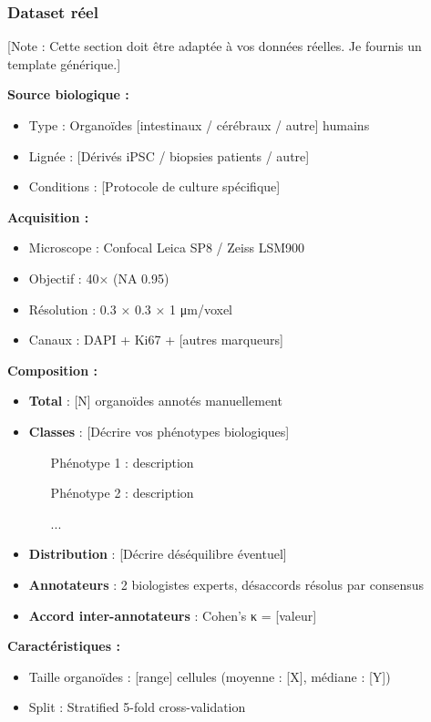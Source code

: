 \subsubsection{Dataset réel}

[Note : Cette section doit être adaptée à vos données réelles. Je fournis un template générique.]

\textbf{Source biologique :}
\begin{itemize}
    \item Type : Organoïdes [intestinaux / cérébraux / autre] humains
    \item Lignée : [Dérivés iPSC / biopsies patients / autre]
    \item Conditions : [Protocole de culture spécifique]
\end{itemize}

\textbf{Acquisition :}
\begin{itemize}
    \item Microscope : Confocal Leica SP8 / Zeiss LSM900
    \item Objectif : 40× (NA 0.95)
    \item Résolution : 0.3 × 0.3 × 1 μm/voxel
    \item Canaux : DAPI + Ki67 + [autres marqueurs]
\end{itemize}

\textbf{Composition :}
\begin{itemize}
    \item \textbf{Total} : [N] organoïdes annotés manuellement
    \item \textbf{Classes} : [Décrire vos phénotypes biologiques]
    \begin{enumerate}
        \item [Phénotype 1 : description]
        \item [Phénotype 2 : description]
        \item [...]
    \end{enumerate}
    \item \textbf{Distribution} : [Décrire déséquilibre éventuel]
    \item \textbf{Annotateurs} : 2 biologistes experts, désaccords résolus par consensus
    \item \textbf{Accord inter-annotateurs} : Cohen's κ = [valeur]
\end{itemize}

\textbf{Caractéristiques :}
\begin{itemize}
    \item Taille organoïdes : [range] cellules (moyenne : [X], médiane : [Y])
    \item Split : Stratified 5-fold cross-validation
\end{itemize}


